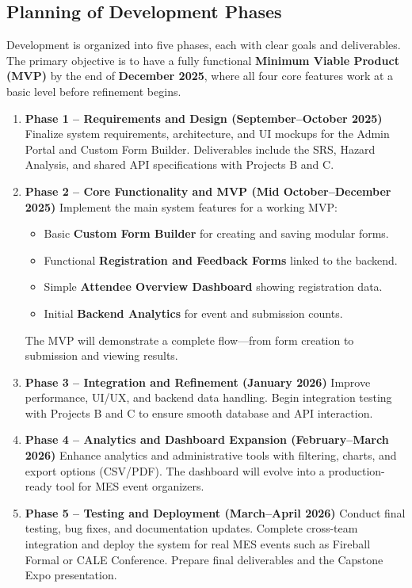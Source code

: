 \documentclass[12pt]{article}
\begin{document}
\subsection{Planning of Development Phases}

Development is organized into five phases, each with clear goals and deliverables.
The primary objective is to have a fully functional \textbf{Minimum Viable Product (MVP)} by the end of \textbf{December 2025}, where all four core features work at a basic level before refinement begins.

\begin{enumerate}
    \item \textbf{Phase 1 – Requirements and Design (September–October 2025)}
    Finalize system requirements, architecture, and UI mockups for the Admin Portal and Custom Form Builder.
    Deliverables include the SRS, Hazard Analysis, and shared API specifications with Projects B and C.

    \item \textbf{Phase 2 – Core Functionality and MVP (Mid October–December 2025)}
    Implement the main system features for a working MVP:
    \begin{itemize}
        \item Basic \textbf{Custom Form Builder} for creating and saving modular forms.
        \item Functional \textbf{Registration and Feedback Forms} linked to the backend.
        \item Simple \textbf{Attendee Overview Dashboard} showing registration data.
        \item Initial \textbf{Backend Analytics} for event and submission counts.
    \end{itemize}
    The MVP will demonstrate a complete flow—from form creation to submission and viewing results.

    \item \textbf{Phase 3 – Integration and Refinement (January 2026)}
    Improve performance, UI/UX, and backend data handling.
    Begin integration testing with Projects B and C to ensure smooth database and API interaction.

    \item \textbf{Phase 4 – Analytics and Dashboard Expansion (February–March 2026)}
    Enhance analytics and administrative tools with filtering, charts, and export options (CSV/PDF).
    The dashboard will evolve into a production-ready tool for MES event organizers.

    \item \textbf{Phase 5 – Testing and Deployment (March–April 2026)}
    Conduct final testing, bug fixes, and documentation updates.
    Complete cross-team integration and deploy the system for real MES events such as Fireball Formal or CALE Conference.
    Prepare final deliverables and the Capstone Expo presentation.
\end{enumerate}
\end{document}
